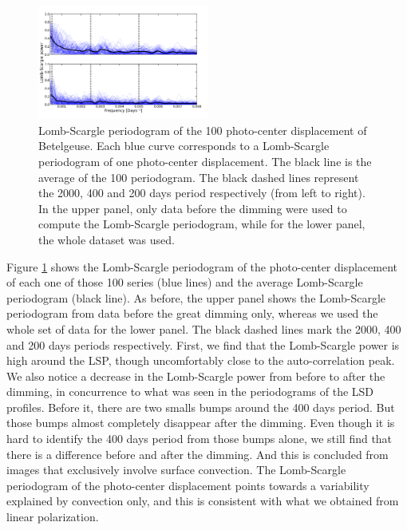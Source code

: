 \documentclass{aa}
\begin{document}
\begin{figure}[!h]
    \centering
    \includegraphics[width=0.5\textwidth]{Lomb-Scargle Photo-center.png}
    \caption{Lomb-Scargle periodogram of the 100 photo-center displacement of Betelgeuse. Each blue curve corresponds to a Lomb-Scargle periodogram of one photo-center
     displacement. The black line is the average of the 100 periodogram. The black dashed lines represent the 2000, 400 and 200 days period respectively 
     (from left to right). In the upper panel, only data before the dimming were used to compute the Lomb-Scargle periodogram, while for the lower panel, the whole dataset was used. }
    \label{LS photocenter}
\end{figure}

Figure \ref{LS photocenter} shows the Lomb-Scargle periodogram of the photo-center displacement of each one of those 100 series (blue lines) and the average Lomb-Scargle periodogram (black line). 
As before, the upper panel shows the Lomb-Scargle periodogram from data before the great dimming only, whereas we used the whole set of data for the lower panel.
The black dashed lines mark the 2000, 400 and 
200 days periods respectively. First, we find that the Lomb-Scargle power is high around the LSP, though
uncomfortably close to the auto-correlation peak.
We also notice a decrease in the Lomb-Scargle power from  before to after the dimming, in 
concurrence to what was seen in the periodograms of the LSD profiles. Before it, there are two smalls bumps around the 400 days period. 
But those bumps almost completely disappear after the dimming. Even though it is 
hard to identify the 400 days period from those bumps alone,
we still find that there is a difference before and after the dimming. 
And this is concluded  from images that exclusively involve surface convection.
The Lomb-Scargle periodogram of the photo-center displacement points towards a variability explained by convection only,
and this is consistent with what we obtained from linear polarization.
\end{document}
